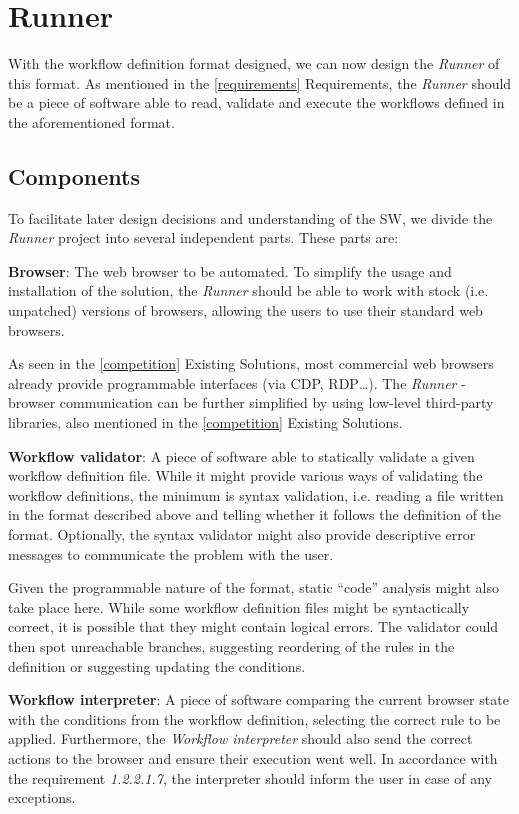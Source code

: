 \section{Runner}\label{runnerDesign}

With the workflow definition format designed, we can now design the \textit{Runner} of this format.
As mentioned in the \autoref{requirements} Requirements, the \textit{Runner} should be a piece of software able to read, validate and execute the workflows defined in the aforementioned format.

\subsection{Components}

To facilitate later design decisions and understanding of the \ac{SW}, we divide the \textit{Runner} project into several independent parts.
These parts are:

\emptyline
\textbf{Browser}:  
The web browser to be automated.
To simplify the usage and installation of the solution, the \textit{Runner} should be able to work with stock (i.e. unpatched) versions of browsers, allowing the users to use their standard web browsers.

As seen in the \autoref{competition} Existing Solutions, most commercial web browsers already provide programmable interfaces (via CDP, RDP\dots).
The \textit{Runner} - browser communication can be further simplified by using low-level third-party libraries, also mentioned in the \autoref{competition} Existing Solutions.

\emptyline
\textbf{Workflow validator}:
A piece of software able to statically validate a given workflow definition file.
While it might provide various ways of validating the workflow definitions, the minimum is syntax validation, i.e. reading a file written 
in the format described above and telling whether it follows the definition of the format.
Optionally, the syntax validator might also provide descriptive error messages to communicate the problem with the user.

Given the programmable nature of the format, static ``code'' analysis might also take place here. 
While some workflow definition files might be syntactically correct, it is possible that they might contain logical errors.
The validator could then spot unreachable branches, suggesting reordering of the rules in the definition or suggesting updating the conditions.

\emptyline
\textbf{Workflow interpreter}:  
A piece of software comparing the current browser state with the conditions from the workflow definition, selecting the correct rule to be applied.
Furthermore, the \textit{Workflow interpreter} should also send the correct actions to the browser and ensure their execution went well.
In accordance with the requirement \textit{1.2.2.1.7}, the interpreter should inform the user in case of any exceptions.

